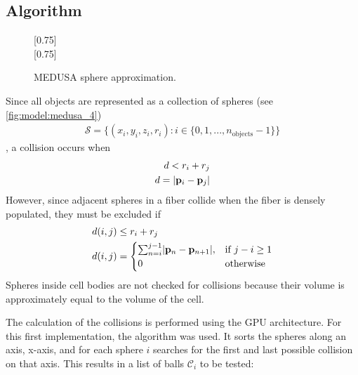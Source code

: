 \subsection{Algorithm}
%
\begin{figure}[!t]
    \centering
    \setlength{\tikzwidth}{0.75\textwidth}
    [0.75\textwidth]{
    }
    \\[2em]
    [0.75\textwidth]{
    }
    \caption{\ac{MEDUSA} sphere approximation.}
    \label{fig:medusaCell}
\end{figure}
%
Since all objects are represented as a collection of spheres (see \cref{fig:model:medusa_4})
\begin{align}
    \mathcal{S} = \{ (x_i,y_i,z_i,r_i) : i \in \{0, 1, ..., n_\text{objects}-1\}  \}
\end{align}
%
, a collision occurs when
%
\begin{align}
\begin{split}
d<r_i+r_j\\
d = \lvert\mathbf{p}_i - \mathbf{p}_j\rvert
\end{split}
\end{align}
%
However, since adjacent spheres in a fiber collide when the fiber is densely populated, they must be excluded if
\begin{align}
\begin{split}
d(i,j) &\leq  r_i + r_j\\
d(i,j) &=
\begin{cases}
\sum_{n=i}^{j-1} \lvert\mathbf{p}_n - \mathbf{p}_{n+1}\rvert,& \text{if } j-i \geq 1\\
0 & \text{otherwise}
\end{cases}
\end{split}
\end{align}
%
Spheres inside cell bodies are not checked for collisions because their volume is approximately equal to the volume of the cell.
\par
%
The calculation of the collisions is performed using the GPU architecture.
For this first implementation, the algorithm  \cite{Karras2012} was used.
It sorts the spheres along an axis, \obda{} x-axis, and for each sphere $i$ searches for the first and last possible collision on that axis.
This results in a list of balls $\mathcal{C}_i$ to be tested:
